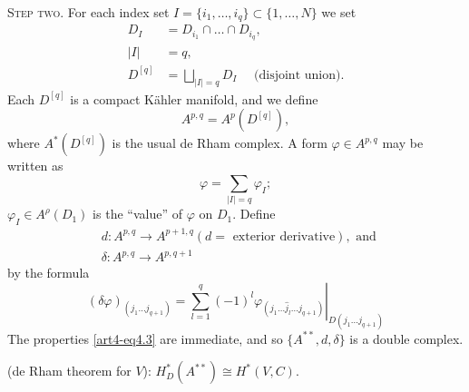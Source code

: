 \medskip
\textsc{Step two.} For each index set $I = \{i_1, \ldots, i_q\} \subset \{1, \ldots, N\}$ we set
\begin{align*}
D_I & = D_{i_1} \cap \ldots \cap D_{i_q},\\
|I| & = q , \\
 D^{[q]} & = \bigsqcup_{|I| = q} D_I \quad  \text{ (disjoint union)}.
\end{align*}
Each $D^{[q]}$ is a compact K\"ahler manifold, and we define
$$
A^{p,q} = A^p (D^{[q]}),
$$
where $A^\ast (D^{[q]})$ is the usual de Rham complex. A form $\varphi \in A^{p,q}$ may be written as 
$$
\varphi = \sum\limits_{|I| = q} \varphi_I ;
$$
$\varphi_I \in A^\rho (D_1)$ is the ``value'' of $\varphi$ on $D_1$. Define
\begin{align*}
& d : A^{p,q} \to A^{p+1,q} (d = \text{ exterior derivative}), \text{ and }\\
& \delta : A^{p,q} \to A^{p,q+1}
\end{align*}\pageoriginale 
by the formula 
\begin{equation}\label{art4-eq4.5}
\left. (\delta \varphi)_{(j_1 \ldots j_{q+1})} = \sum^q_{l=1} (-1)^l \varphi_{(j_1 \ldots \hat{j}_l \ldots j_{q+1})}  \right|_{D (j_1 \ldots j_{q+1})}  
\end{equation}
The properties \eqref{art4-eq4.3} are immediate, and so $\{A^{\ast\ast}, d, \delta\}$ is a double complex.

\begin{lemma}\label{art4-lem4.6}
(de Rham theorem for $V$): $H^\ast_D (A^{\ast\ast}) \cong H^\ast (V,C)$.
\end{lemma}

